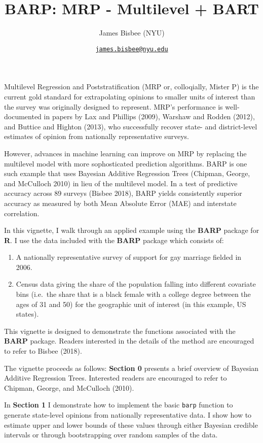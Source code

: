 \documentclass[]{article}
\title{BARP: MRP - Multilevel + BART}
\author{James Bisbee (NYU)}
\date{\href{mailto:james.bisbee@nyu.edu}{\nolinkurl{james.bisbee@nyu.edu}}}
\providecommand{\tightlist}{%
  \setlength{\itemsep}{0pt}\setlength{\parskip}{0pt}}
\begin{document}
\maketitle

Multilevel Regression and Poststratification (MRP or, colloqially,
Mister P) is the current gold standard for extrapolating opinions to
smaller units of interest than the survey was originally designed to
represent. MRP's performance is well-documented in papers by Lax and
Phillips (2009), Warshaw and Rodden (2012), and Buttice and Highton
(2013), who successfully recover state- and district-level estimates of
opinion from nationally representative surveys.

However, advances in machine learning can improve on MRP by replacing
the multilevel model with more sophosticated prediction algorithms. BARP
is one such example that uses Bayesian Additive Regression Trees
(Chipman, George, and McCulloch 2010) in lieu of the multilevel model.
In a test of predictive accuracy across 89 surveys (Bisbee 2018), BARP
yields consistently superior accuracy as measured by both Mean Absolute
Error (MAE) and interstate correlation.

In this vignette, I walk through an applied example using the
\textbf{BARP} package for \textbf{R}. I use the data included with the
\textbf{BARP} package which consists of:

\begin{enumerate}
\def\labelenumi{\arabic{enumi}.}
\tightlist
\item
  A nationally representative survey of support for gay marriage fielded
  in 2006.
\item
  Census data giving the share of the population falling into different
  covariate bins (i.e.~the share that is a black female with a college
  degree between the ages of 31 and 50) for the geographic unit of
  interest (in this example, US states).
\end{enumerate}

This vignette is designed to demonstrate the functions associated with
the \textbf{BARP} package. Readers interested in the details of the
method are encouraged to refer to Bisbee (2018).

The vignette proceeds as follows: \textbf{Section 0} presents a brief
overview of Bayesian Additive Regression Trees. Interested readers are
encouraged to refer to Chipman, George, and McCulloch (2010).

In \textbf{Section 1} I demonstrate how to implement the basic
\texttt{barp} function to generate state-level opinions from nationally
representative data. I show how to estimate upper and lower bounds of
these values through either Bayesian credible intervals or through
bootstrapping over random samples of the data.
\end{document}
